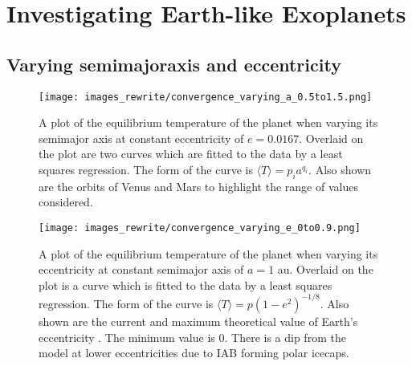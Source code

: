 \documentclass[12pt, onecolumn]{revtex4-2}    %
\begin{document}
\section{Investigating Earth-like Exoplanets} \label{sec:Exoplanets}
%
\subsection{Varying semimajoraxis and eccentricity} \label{ssec:InvTimeAveragedSolarFlux}
%
\begin{figure}[t]
  \texttt{[image: images\_rewrite/convergence\_varying\_a\_0.5to1.5.png]}
  \caption{
    A plot of the equilibrium temperature of the planet when varying its semimajor axis at constant eccentricity of $e=0.0167$.
    Overlaid on the plot are two curves which are fitted to the data by a least squares regression.
    The form of the curve is $\langle T \rangle = p_i a^{q_i}$.
    Also shown are the orbits of Venus and Mars to highlight the range of values considered.
  }
  \label{fig:planet_semimajoraxis}
\end{figure}

\begin{figure}[t]
  \texttt{[image: images\_rewrite/convergence\_varying\_e\_0to0.9.png]}
  \caption{
    A plot of the equilibrium temperature of the planet when varying its eccentricity at constant semimajor axis of $a = 1$ au.
    Overlaid on the plot is a curve which is fitted to the data by a least squares regression.
    The form of the curve is $\langle T \rangle = p(1-e^2)^{-1/8}$.
    Also shown are the current and maximum theoretical value of Earth's eccentricity \cite{LA2010}.
    The minimum value is $0$.
    There is a dip from the model at lower eccentricities due to IAB forming polar icecaps.
  }
  \label{fig:planet_eccentricity}
\end{figure}
\end{document}
